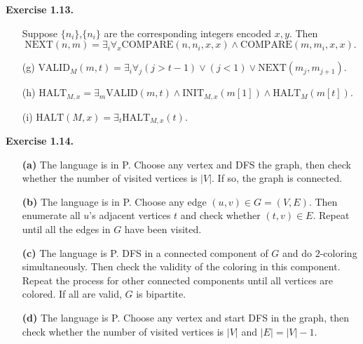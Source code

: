 \documentclass[a4paper]{article}
\newenvironment{exercise}[1]{
	\par
	\noindent\textbf{Exercise #1.}\quad
}{
	\par
	\bigskip
}
\begin{document}
\begin{exercise}{1.13}
\begin{itemize}
            Suppose $\{n_i\}$,$\{n_i\}$ are the corresponding integers encoded $x,y$.
            Then 
            $$
            \text{NEXT}(n,m)=\exists_i\forall_x\text{COMPARE}(n,n_i,x,x)\wedge\text{COMPARE}(m,m_i,x,x).
            $$
        \item[(g)] $\text{VALID}_M(m,t)=\exists_i\forall_j (j>t-1)\vee(j<1)\vee\text{NEXT}(m_j,m_{j+1})$.
        \item[(h)] $\text{HALT}_{M,x}=\exists_m\text{VALID}(m,t)\wedge\text{INIT}_{M,x}(m[1])\wedge\text{HALT}_M(m[t])$.
        \item[(i)] $\text{HALT}(M,x)=\exists_t\text{HALT}_{M,x}(t)$.
	\end{itemize}
\end{exercise}

\begin{exercise}{1.14}
\begin{enumerate}		
	\item[\textbf{(a)}] 
		The language is in P.
		Choose any vertex and DFS the graph, then check whether the number of visited vertices is $|V|$. 
        If so, the graph is connected.
		\item[\textbf{(b)}] 
		The language is in P.
        Choose any edge $(u,v)\in G=(V,E)$. Then enumerate all $u$'s adjacent vertices $t$ and check whether $(t,v)\in E$. 
        Repeat until all the edges in $G$ have been visited.
		\item[\textbf{(c)}] 
		The language is P.
		DFS in a connected component of $G$ and do $2$-coloring simultaneously.
        Then check the validity of the coloring in this component. 
        Repeat the process for other connected components until all vertices are colored.
        If all are valid, $G$ is bipartite. 
		\item[\textbf{(d)}] 
		The language is P.
        Choose any vertex and start DFS in the graph, then
        check whether the number of visited vertices is $|V|$ and $|E|=|V|-1$.
\end{enumerate}
\end{exercise}
\end{document}
